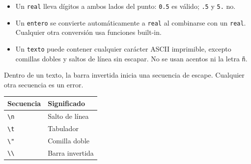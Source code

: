 \documentclass[spanish,11pt,letterpaper]{article}
\begin{document}
	\noindent
	\begin{minipage}[t]{0.55\linewidth}
		\vspace{0pt}
		\begin{itemize}
			\item Un \texttt{real} lleva d\'igitos a ambos lados del punto: \texttt{0.5} es v\'alido; \texttt{.5} y \texttt{5.} no.
			\item Un \texttt{entero} se convierte autom\'aticamente a \texttt{real} al combinarse con un \texttt{real}. Cualquier otra conversi\'on usa funciones built-in.
			\item Un \texttt{texto} puede contener cualquier car\'acter ASCII imprimible, excepto comillas dobles y saltos de l\'inea sin	escapar. No se usan acentos ni la letra \texttt{\~n}.
		\end{itemize}
	\end{minipage}
	\hfill
	\begin{minipage}[t]{0.41\linewidth}
		\vspace{0pt}
		Dentro de un texto, la barra invertida inicia una secuencia de escape.
		Cualquier otra secuencia es un error.
		
		\medskip
		\centering
		\begin{tabular}{@{}ll@{}}
			\toprule
			\textbf{Secuencia} & \textbf{Significado} \\
			\midrule
			\texttt{\textbackslash n} & Salto de l\'inea \\
			\texttt{\textbackslash t} & Tabulador \\
			\texttt{\textbackslash "} & Comilla doble \\
			\texttt{\textbackslash\textbackslash} & Barra invertida \\
			\bottomrule
		\end{tabular}
	\end{minipage}
	
\end{document}
